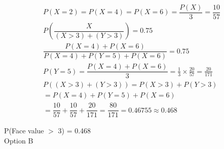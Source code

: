 \documentclass[journal,12pt,twocolumn]{IEEEtran}
\begin{document}
\begin{align}
    P(X = 2) = P(X = 4) = P(X = 6) = \dfrac{P(X)}{3} =     \dfrac{10}{57}\\
    P\left(\dfrac{X}{(X > 3) + (Y > 3)}\right) = 0.75\\
    \dfrac{P(X = 4) + P(X = 6)}{P(X = 4) + P(Y = 5) + P(X = 6)} =     0.75\\[5pt]
    P(Y = 5) = \dfrac {P(X = 4) + P(X = 6)}{3}
    = \frac{1}{3}\times\frac{20}{57} = \frac{20}{171}\\
    P((X > 3) + (Y > 3)) = P(X > 3) + P(Y > 3)\\
    = P(X = 4) + P(Y = 5) + P(X = 6)\\
    = \dfrac{10}{57} + \dfrac{10}{57} + \dfrac{20}{171} =     \dfrac{80}{171} = 0.46755 \approx 0.468
\end{align}

\centering
\Large P(Face value $>$ 3) = 0.468\\[5pt]
Option B
\end{document}
